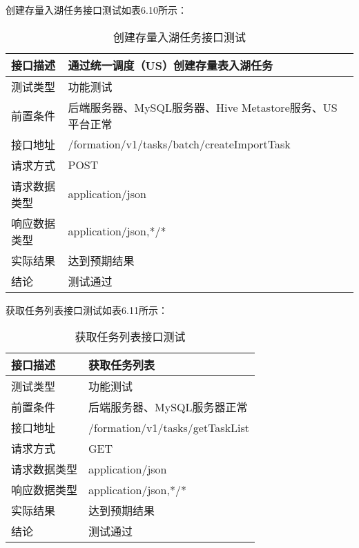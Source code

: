 创建存量入湖任务接口测试如表6.10所示：

\begin{table}[h]
  \centering
  \caption{创建存量入湖任务接口测试}
  \label{tab:exampletable}
  \begin{tabular}{ll}
    \toprule
    接口描述         & 通过统一调度（US）创建存量表入湖任务         \\
    \midrule
    测试类型         & 功能测试         \\
    前置条件         & 后端服务器、MySQL服务器、Hive Metastore服务、US平台正常         \\
    接口地址       & /formation/v1/tasks/batch/createImportTask        \\
    请求方式         & POST      \\
    请求数据类型         & application/json     \\
    响应数据类型         & application/json,*/*           \\
    实际结果         & 达到预期结果           \\
    结论            & 测试通过           \\
    \bottomrule
  \end{tabular}
\end{table}

获取任务列表接口测试如表6.11所示：

\begin{table}[h]
  \centering
  \caption{获取任务列表接口测试}
  \label{tab:exampletable}
  \begin{tabular}{ll}
    \toprule
    接口描述         & 获取任务列表         \\
    \midrule
    测试类型         & 功能测试         \\
    前置条件         & 后端服务器、MySQL服务器正常         \\
    接口地址       & /formation/v1/tasks/getTaskList        \\
    请求方式         & GET      \\
    请求数据类型         & application/json     \\
    响应数据类型         & application/json,*/*           \\
    实际结果         & 达到预期结果           \\
    结论            & 测试通过           \\
    \bottomrule
  \end{tabular}
\end{table}

